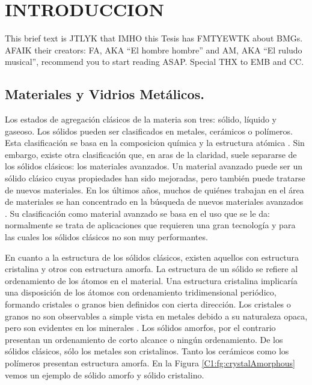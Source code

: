 
\chapter{INTRODUCCION} %

\label{C1} %


This brief text is JTLYK that IMHO this Tesis has FMTYEWTK about BMGs. AFAIK their creators: FA, AKA ``El hombre hombre'' and AM, AKA ``El ruludo musical'', recommend you to start reading ASAP. Special THX to EMB and CC.


\section{Materiales y Vidrios Metálicos.}
\label{S1_1}

Los estados de agregación clásicos de la materia son tres: sólido, líquido y gaseoso. Los sólidos pueden ser clasificados en metales, cerámicos o polímeros. Esta clasificación se basa en la composicion química y la estructura atómica \cite{callister95}. Sin embargo, existe otra clasificación que, en aras de la claridad, suele separarse de los sólidos clásicos: los materiales avanzados. Un material avanzado puede ser un sólido clásico cuyas propiedades han sido mejoradas, pero también puede tratarse de nuevos materiales. En los últimos años, muchos de quiénes trabajan en el área de materiales se han concentrado en la búsqueda de nuevos materiales avanzados \cite{suryana11}. Su clasificación como material avanzado se basa en el uso que se le da: normalmente se trata de aplicaciones que requieren una gran tecnología y para las cuales los sólidos clásicos no son muy performantes.

En cuanto a la estructura de los sólidos clásicos, existen aquellos con estructura cristalina y otros con estructura amorfa. La estructura de un sólido se refiere al ordenamiento de los átomos en el material. Una estructura cristalina implicaría una disposición de los átomos con ordenamiento tridimensional periódico, formando cristales o granos bien definidos con cierta dirección. Los cristales o granos no son observables a simple vista en metales debido a su naturaleza opaca, pero son evidentes en los minerales \cite{smith96}. Los sólidos amorfos, por el contrario presentan un ordenamiento de corto alcance o ningún ordenamiento. De los sólidos clásicos, sólo los metales son cristalinos. Tanto los cerámicos como los polímeros presentan estructura amorfa. En la Figura \ref{C1:fg:crystalAmorphous} vemos un ejemplo de sólido amorfo y sólido cristalino.

